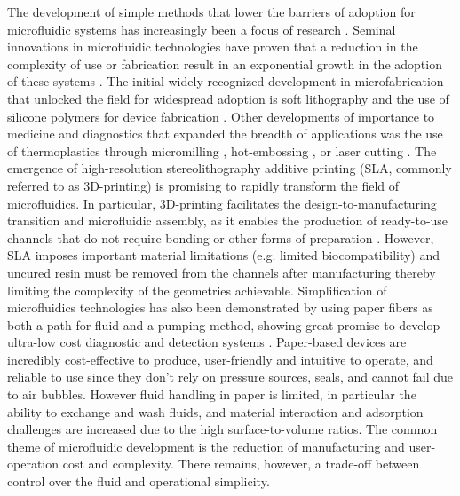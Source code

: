The development of simple methods that lower the barriers of adoption for microfluidic systems has increasingly been a focus of research \cite{Berthier2013,Casavant2013b, Du2009, Guckenberger2015, Walker2002, Young2011}. Seminal innovations in microfluidic technologies have proven that a reduction in the complexity of use or fabrication result in an exponential growth in the adoption of these systems \cite{Berthier2012,Sackmann2014a}. The initial widely recognized development in microfabrication that unlocked the field for widespread adoption is soft lithography and the use of silicone polymers for device fabrication \cite{Sia2003a}. Other developments of importance to medicine and diagnostics that expanded the breadth of applications was the use of thermoplastics through micromilling \cite{Guckenberger2015b, Wilson2011}, hot-embossing \cite{Young2011}, or laser cutting \cite{Klank2002, Yuen2009MultidimensionalSystem}. The emergence of high-resolution stereolithography additive printing (SLA, commonly referred to as 3D-printing) is promising to rapidly transform the field of microfluidics. In particular, 3D-printing facilitates the design-to-manufacturing transition and microfluidic assembly, as it enables the production of ready-to-use channels that do not require bonding or other forms of preparation \cite{Au2014, Bhargava2014}. However, SLA imposes important material limitations (e.g. limited biocompatibility) and uncured resin must be removed from the channels after manufacturing thereby limiting the complexity of the geometries achievable. Simplification of microfluidics technologies has also been demonstrated by using paper fibers as both a path for fluid and a pumping method, showing great promise to develop ultra-low cost diagnostic and detection systems \cite{Martinez2008, Osborn2010a, Park2013a}. Paper-based devices are incredibly cost-effective to produce, user-friendly and intuitive to operate, and reliable to use since they don’t rely on pressure sources, seals, and cannot fail due to air bubbles. However fluid handling in paper is limited, in particular the ability to exchange and wash fluids, and material interaction and adsorption challenges are increased due to the high surface-to-volume ratios. The common theme of microfluidic development is the reduction of manufacturing and user-operation cost and complexity. There remains, however, a trade-off between control over the fluid and operational simplicity.

